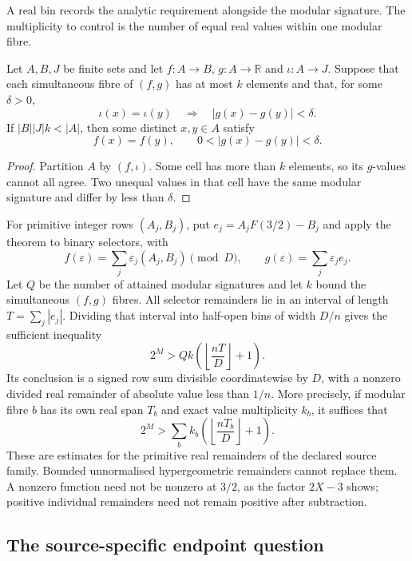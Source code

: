 \documentclass[11pt]{article}
\begin{document}
A real bin records the analytic requirement alongside the modular signature.
The multiplicity to control is the number of equal real values within one
modular fibre.

\begin{theorem}\label{res:boundedfibre}
Let $A,B,J$ be finite sets and let $f:A\to B$, $g:A\to\mathbb R$ and
$\iota:A\to J$.  Suppose that each simultaneous fibre of $(f,g)$ has at
most $k$ elements and that, for some $\delta>0$,
\[
 \iota(x)=\iota(y)\quad\Longrightarrow\quad |g(x)-g(y)|<\delta.
\]
If $|B||J|k<|A|$, then some distinct $x,y\in A$ satisfy
\[
 f(x)=f(y),\qquad 0<|g(x)-g(y)|<\delta.
\]
\end{theorem}
\begin{proof}
Partition $A$ by $(f,\iota)$.  Some cell has more than $k$ elements, so its
$g$-values cannot all agree.  Two unequal values in that cell have the same
modular signature and differ by less than $\delta$.
\end{proof}

For primitive integer rows $(A_j,B_j)$, put $e_j=A_jF(3/2)-B_j$ and apply
the theorem to binary selectors, with
\[
 f(\varepsilon)=\sum_j\varepsilon_j(A_j,B_j)\pmod D,
 \qquad g(\varepsilon)=\sum_j\varepsilon_j e_j.
\]
Let $Q$ be the number of attained modular signatures and let $k$ bound the
simultaneous $(f,g)$ fibres.  All selector remainders lie in an interval of
length $T=\sum_j|e_j|$.  Dividing that interval into half-open bins of width
$D/n$ gives the sufficient inequality
\begin{equation}\label{eq:quantitative-selector-budget}
 2^M>Qk\left(\left\lfloor\frac{nT}{D}\right\rfloor+1\right).
\end{equation}
Its conclusion is a signed row sum divisible coordinatewise by $D$, with a
nonzero divided real remainder of absolute value less than $1/n$.
More precisely, if modular fibre $b$ has its own real span $T_b$ and exact
value multiplicity $k_b$, it suffices that
\[
 2^M>\sum_b k_b\left(\left\lfloor\frac{nT_b}{D}\right\rfloor+1\right).
\]
These are estimates for the primitive real remainders of the declared source
family.  Bounded unnormalised hypergeometric remainders cannot replace them.
A nonzero function need not be nonzero at $3/2$, as the factor $2X-3$ shows;
positive individual remainders need not remain positive after subtraction.

\subsection{The source-specific endpoint question}
\end{document}
